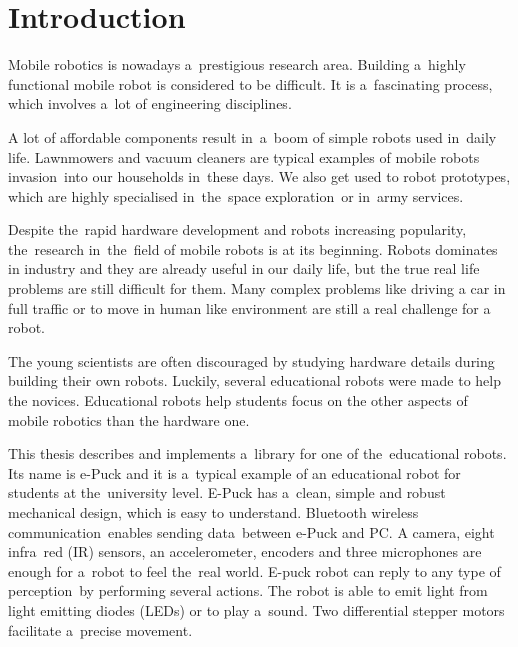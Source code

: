 \chapter{Introduction}
\label{chap:intro}
  Mobile robotics is nowadays a~prestigious research area. Building a~highly functional 
  mobile robot is considered to be difficult. 
  It is a~fascinating process, which
  involves a~lot of engineering disciplines.
  
  A lot of affordable components result in~a~boom of simple robots used in~daily life. 
  Lawnmowers and vacuum cleaners are typical examples of mobile robots invasion~into our households in~these days.
  We also get used to robot prototypes, which are highly specialised in~the~space exploration~or in~army services.

  Despite the~rapid hardware development and robots increasing popularity,
  the~research in~the~field of mobile robots is at its beginning.
  Robots dominates in industry and they are already useful in our daily
  life, but the true real life problems are still difficult for them.
  Many complex problems like driving a car in full traffic or to move in human
  like environment are still a real challenge for a robot.
   
  The young scientists are often discouraged by
  studying hardware details during building their own robots.
  Luckily, several educational robots were made to help the novices.
  Educational robots help students focus on the other aspects of mobile robotics than the hardware one.
 
  This thesis describes and implements a~library for one of the~educational robots.
  Its name is e-Puck and it is a~typical example of an educational robot for students at the~university level. 
  E-Puck has a~clean, simple and robust mechanical design, which is easy to understand.
  Bluetooth wireless communication~enables sending data~between e-Puck and PC.
  A camera, eight infra~red (IR) sensors,	an accelerometer, encoders and three microphones 
  are enough for a~robot to feel the~real world.
  E-puck robot can reply to any type of perception~by performing several actions. 
  The robot is able to emit light from light emitting diodes (LEDs) or to play a~sound.
  Two differential stepper motors facilitate a~precise movement. 
  
  
